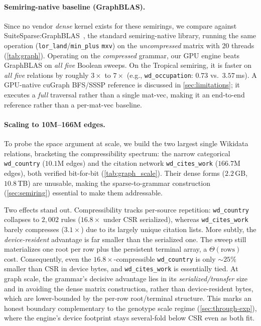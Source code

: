 \documentclass[twoside,leqno,twocolumn]{article}
\begin{document}
\paragraph{Semiring-native baseline (GraphBLAS).}

Since no vendor \emph{dense} kernel exists for these semirings, we compare against SuiteSparse:GraphBLAS~\cite{graphblas}, the standard semiring-native library, running the same operation (\texttt{lor\_land}/\texttt{min\_plus} \texttt{mxv}) on the \emph{uncompressed} matrix with 20 threads (\cref{tab:graph}). Operating on the \emph{compressed} grammar, our GPU engine beats GraphBLAS on \emph{all five} Boolean sweeps. On the Tropical semiring, it is faster on \emph{all five} relations by roughly $3\times$ to $7\times$ (e.g., \texttt{wd\_occupation}: $0.73$ vs.\ $3.57$\,ms). A GPU-native cuGraph BFS/SSSP reference is discussed in \cref{sec:limitations}; it executes a \emph{full} traversal rather than a single mat-vec, making it an end-to-end reference rather than a per-mat-vec baseline.

\paragraph{Scaling to 10M--166M edges.}

To probe the space argument at scale, we build the two largest single Wikidata relations, bracketing the compressibility spectrum: the narrow categorical \texttt{wd\_country} ($10.1$M edges) and the citation network \texttt{wd\_cites\_work} ($166.7$M edges), both verified bit-for-bit (\cref{tab:graph_scale}). Their dense forms ($2.2$\,GB, $10.8$\,TB) are unusable, making the sparse-to-grammar construction (\cref{sec:semiring}) essential to make them addressable. 

Two effects stand out. Compressibility tracks per-source repetition: \texttt{wd\_country} collapses to $2{,}002$ rules ($\mathbf{16.8\times}$ under CSR serialized), whereas \texttt{wd\_cites\_work} barely compresses ($3.1\times$) due to its largely unique citation lists. More subtly, the \emph{device-resident} advantage is far smaller than the serialized one. The sweep still materializes one root per row plus the persistent terminal array, a $\Theta(\text{rows})$ cost. Consequently, even the $16.8\times$-compressible \texttt{wd\_country} is only $\sim\!25\%$ smaller than CSR in device bytes, and \texttt{wd\_cites\_work} is essentially tied. At graph scale, the grammar's decisive advantage lies in its \emph{serialized/transfer} size and in avoiding the dense matrix construction, rather than device-resident bytes, which are lower-bounded by the per-row root/terminal structure. This marks an honest boundary complementary to the genotype scale regime (\cref{sec:through-exp}), where the engine's device footprint stays several-fold below CSR even as both fit.
\end{document}
